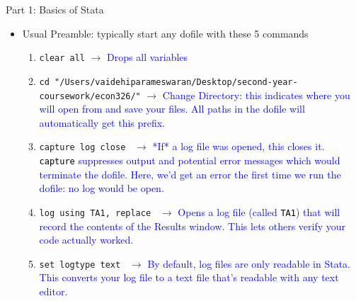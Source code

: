 \documentclass[11pt,notes=hide,aspectratio=169,mathserif]{beamer}
\begin{document}
\begin{frame}{Part 1: Basics of Stata}
    \begin{itemize}
        \item Usual Preamble: typically start any dofile with these 5 commands\smallskip
        \begin{enumerate}
            \item  \texttt{clear all} $\rightarrow$ \textcolor{blue}{Drops all variables}\smallskip
            \item  \texttt{cd "/Users/vaidehiparameswaran/Desktop/second-year-coursework/econ326/"} $\rightarrow$ \textcolor{blue}{Change Directory: this indicates where you will open from and save your files. All paths in the dofile will automatically get this prefix.}\smallskip
            \item \texttt{capture log close } $\rightarrow$ \textcolor{blue}{*If* a log file was opened, this closes it. \textcolor{black}{\texttt{capture}} suppresses output and potential error messages which would terminate the dofile. Here, we'd get an error the first time we run the dofile: no log would be open.}\smallskip
            \item \texttt{log using TA1, replace } $\rightarrow$ \textcolor{blue}{Opens a log file (called \textcolor{black}{\texttt{TA1}}) that will record the contents of the Results window. This lets others verify your code actually worked. }\smallskip
            \item \texttt{set logtype text }   $\rightarrow$ \textcolor{blue}{By default, log files are only readable in Stata. This converts your log file to a text file that's readable with any text editor.}
        \end{enumerate}
    \end{itemize}
\end{frame}
\end{document}
